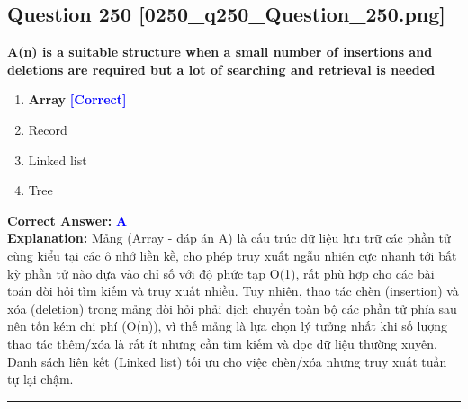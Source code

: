 \documentclass[11pt,a4paper]{article}
\begin{document}
\begin{minipage}{\textwidth}
\subsection*{Question 250 \quad \footnotesize{[0250\_q250\_Question\_250.png]}}
\noindent \textbf{A(n) is a suitable structure when a small number of insertions and deletions are required but a lot of searching and retrieval is needed}

\begin{enumerate}[label=\Alph*.]
    \item \textbf{Array} \hfill \textcolor{blue}{\textbf{[Correct]}}
    \item Record
    \item Linked list
    \item Tree
\end{enumerate}

\noindent \textbf{Correct Answer:} \textcolor{blue}{\textbf{A}} \\[2pt]
\noindent \textbf{Explanation:} Mảng (Array - đáp án A) là cấu trúc dữ liệu lưu trữ các phần tử cùng kiểu tại các ô nhớ liền kề, cho phép truy xuất ngẫu nhiên cực nhanh tới bất kỳ phần tử nào dựa vào chỉ số với độ phức tạp O(1), rất phù hợp cho các bài toán đòi hỏi tìm kiếm và truy xuất nhiều. Tuy nhiên, thao tác chèn (insertion) và xóa (deletion) trong mảng đòi hỏi phải dịch chuyển toàn bộ các phần tử phía sau nên tốn kém chi phí (O(n)), vì thế mảng là lựa chọn lý tưởng nhất khi số lượng thao tác thêm/xóa là rất ít nhưng cần tìm kiếm và đọc dữ liệu thường xuyên. Danh sách liên kết (Linked list) tối ưu cho việc chèn/xóa nhưng truy xuất tuần tự lại chậm.

\par\vspace{0.3cm}
\hrule
\vspace{0.3cm}
\end{minipage}
\end{document}
